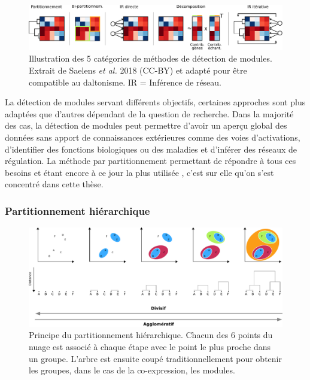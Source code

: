 \begin{figure}[ht]
    \centering
    \includegraphics[width=\textwidth]{img/intro/3_coexpr/intro_3_coexpr_category_detection_module.pdf}
    \caption[Illustration des 5 catégories de méthodes de détection de modules.]{Illustration des 5 catégories de méthodes de détection de modules. Extrait de Saelens \textit{et al.} 2018 (CC-BY) \cite{Saelens2018} et adapté pour être compatible au daltonisme. IR = Inférence de réseau.}
    \label{fig:category_detection_module}
\end{figure}

La détection de modules servant différents objectifs, certaines approches sont plus adaptées que d'autres dépendant de la question de recherche. Dans la majorité des cas, la détection de modules peut permettre d'avoir un aperçu global des données sans apport de connaissances extérieures comme des voies d'activations, d'identifier des fonctions biologiques ou des maladies et d'inférer des réseaux de régulation. La méthode par partitionnement permettant de répondre à tous ces besoins \cite{Filteau2013,Sundarrajan2016,Kogelman2014} et étant encore à ce jour la plus utilisée \cite{Saelens2018}, c'est sur elle qu'on s'est concentré dans cette thèse.

\subsubsection{Partitionnement hiérarchique}

\begin{figure}[b]
    \centering
    \includegraphics[width=\textwidth]{img/intro/3_coexpr/intro_3_coexpr_hierarchical_clustering.pdf}
    \caption{Principe du partitionnement hiérarchique. Chacun des 6 points du nuage est associé à chaque étape avec le point le plus proche dans un groupe. L'arbre est ensuite coupé traditionnellement pour obtenir les groupes, dans le cas de la co-expression, les modules.}
    \label{fig:partitionnement_hierarchique_principle}
\end{figure}

